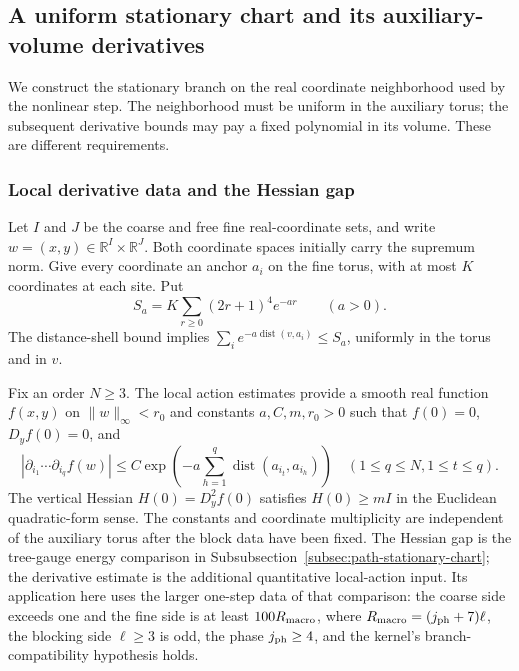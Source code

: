 \subsection{A uniform stationary chart and its auxiliary-volume derivatives}
\label{sec:uniform-stationary-chart}
We construct the stationary branch on the real coordinate neighborhood
used by the nonlinear step. The neighborhood must be uniform in the
auxiliary torus; the subsequent derivative bounds may pay a fixed
polynomial in its volume. These are different requirements.

\subsubsection{Local derivative data and the Hessian gap}
Let $I$ and $J$ be the coarse and free fine real-coordinate sets,
and write $w=(x,y)\in\mathbb R^I\times\mathbb R^J$. Both coordinate
spaces initially carry the supremum norm. Give every coordinate an
anchor $a_i$ on the fine torus, with at most $K$ coordinates at each
site. Put
\[
       S_a=K\sum_{r\ge0}(2r+1)^4e^{-ar}\qquad(a>0).
\]
The distance-shell bound implies
$\sum_i e^{-a\operatorname{dist}(v,a_i)}\le S_a$, uniformly in the
torus and in $v$.

Fix an order $N\ge3$. The local action estimates provide a smooth
real function $f(x,y)$ on $\|w\|_\infty<r_0$ and constants
$a,C,m,r_0>0$ such that $f(0)=0$, $D_yf(0)=0$, and
\begin{equation}\label{eq:stationary-scatter-input}
 |\partial_{i_1}\cdots\partial_{i_q}f(w)|
 \le C\exp\!\left(-a\sum_{h=1}^q
                  \operatorname{dist}(a_{i_t},a_{i_h})\right)
 \quad(1\le q\le N, 1\le t\le q).
\end{equation}
The vertical Hessian $H(0)=D_y^2f(0)$ satisfies
$H(0)\ge mI$ in the Euclidean quadratic-form sense.
The constants and coordinate multiplicity are independent of the
auxiliary torus after the block data have been fixed. The Hessian
gap is the tree-gauge energy comparison in
Subsubsection~\ref{subsec:path-stationary-chart}; the derivative estimate
is the additional quantitative local-action input. Its application here
uses the larger one-step data of that comparison: the coarse side exceeds
one and the fine side is at least $100R_{\rm macro}$, where
$R_{\rm macro}=(j_{\rm ph}+7)\ell$, the blocking side $\ell\ge3$ is odd,
the phase $j_{\rm ph}\ge4$, and the kernel's branch-compatibility
hypothesis holds.

